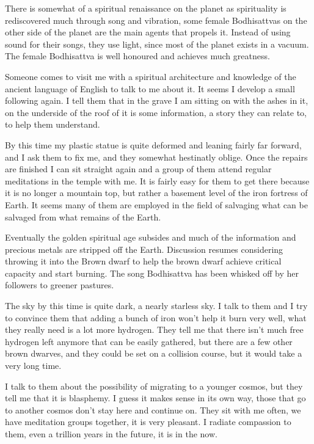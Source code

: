 There is somewhat of a spiritual renaissance on the planet as spirituality is
rediscovered much through song and vibration, some female Bodhisattvas on the 
other side of the planet are the main agents that propels it. Instead of using
sound for their songs, they use light, since most of the planet exists in a
vacuum. The female Bodhisattva is well honoured and achieves much greatness. 

Someone comes to visit me with a spiritual architecture and knowledge of the 
ancient language of English to talk to me about it. It seems I develop a small 
following again. I tell them that in the grave I am sitting on with the ashes in
it, on the underside of the roof of it is some information, a story they can
relate to, to help them understand. 

By this time my plastic statue is quite deformed and leaning fairly far forward,
and I ask them to fix me, and they somewhat hestinatly oblige. Once the repairs
are finished I can sit straight again and a group of them attend regular
meditations in the temple with me. It is fairly easy for them to get there
because it is no longer a mountain top, but rather a basement level of the iron
fortress of Earth. It seems many of them are employed in the field of salvaging
what can be salvaged from what remains of the Earth. 

Eventually the golden spiritual age subsides and much of the information and 
precious metals are stripped off the Earth. Discussion resumes considering 
throwing it into the Brown dwarf to help the brown dwarf achieve critical 
capacity and start burning. The song Bodhisattva has been whisked off by her 
followers to greener pastures. 

The sky by this time is quite dark, a nearly starless sky. I talk to them and I
try to convince them that adding a bunch of iron won't help it burn very well,
what they really need is a lot more hydrogen. They tell me that there isn't much
free hydrogen left anymore that can be easily gathered, but there are a few 
other brown dwarves, and they could be set on a collision course, but it would 
take a very long time.

I talk to them about the possibility of migrating to a younger cosmos, but they
tell me that it is blasphemy. I guess it makes sense in its own way, those that
go to another cosmos don't stay here and continue on. They sit
with me often, we have meditation groups together, it is very pleasant. I
radiate compassion to them, even a trillion years in the future, it is in the
now. 

